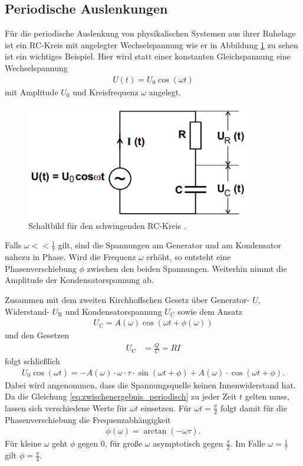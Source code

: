 \subsection{Periodische Auslenkungen}
Für die periodische Auslenkung von physikalischen Systemen aus ihrer Ruhelage ist ein RC-Kreis mit angelegter Wechselspannung
wie er in Abbildung \ref{fig:schwingend} zu sehen ist ein wichtiges Beispiel.
Hier wird statt einer konstanten Gleichspannung eine Wechselspannung 
\begin{align}
    U(t) = U_0 \cos(\omega t)
\end{align}
mit Amplitude $U_0$ und Kreisfrequenz $\omega$ angelegt. 
\begin{figure}[H]
    \centering
    \includegraphics[height=5cm]{abbildungen/oszillatorisch.png}
    \caption{Schaltbild für den schwingenden RC-Kreis \cite{man:v353}.}
    \label{fig:schwingend}
\end{figure}

\noindent
Falls $\omega << \frac{1}{\tau}$ gilt, sind die Spannungen am Generator und am Kondensator nahezu in Phase.
Wird die Frequenz $\omega$ erhöht, so entsteht eine Phasenverschiebung $\phi$ zwischen den beiden Spannungen.
Weiterhin nimmt die Amplitude der Kondensatorspannung ab.

\noindent
Zusammen mit dem zweiten Kirchhoffschen Gesetz über Generator- $U$, Widerstand- $U_\text{R}$ und Kondensatorspannung $U_\text{C}$ sowie dem Ansatz 
\begin{align}
    U_\text{C} = A(\omega) \cos\left(\omega t + \phi(\omega)\right)
\end{align}
und den Gesetzen
\begin{align*}
    U_\text{C} &= \frac{Q}{C} = R I
\end{align*}
folgt schließlich 
\begin{align}
    U_0 \cos(\omega t) = -A(\omega) \cdot \omega \cdot \tau \cdot \sin\left(\omega t + \phi\right) + A(\omega) \cdot \cos\left(\omega t + \phi\right).
    \label{eq:zwischenergebnis_periodisch}
\end{align}
Dabei wird angenommen, dass die Spannungsquelle keinen Innenwiderstand hat.
Da die Gleichung \eqref{eq:zwischenergebnis_periodisch} zu jeder Zeit $t$ gelten muss,
lassen sich verschiedene Werte für $\omega t$ einsetzen.
Für $\omega t = \frac{\pi}{2}$ folgt damit für die Phasenverschiebung die Frequenzabhängigkeit
\begin{align}
    \phi(\omega) = \arctan(- \omega \tau).
    \label{eq:phasenverschiebung}
\end{align}
Für kleine $\omega$ geht $\phi$ gegen 0, für große $\omega$ asymptotisch gegen $\frac{\pi}{2}$.
Im Falle $\omega = \frac{1}{\tau}$ gilt $\phi = \frac{\pi}{4}$.


